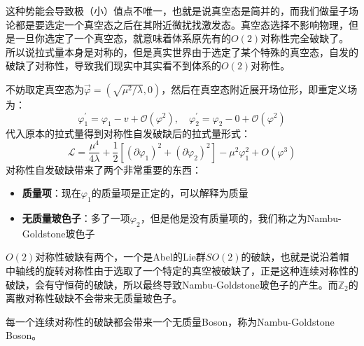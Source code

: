 这种势能会导致极（小）值点不唯一，也就是说真空态是简并的，而我们做量子场论都是要选定一个真空态之后在其附近微扰找激发态。真空态选择不影响物理，但是一旦你选定了一个真空态，就意味着体系原先有的$O(2)$对称性完全破缺了。所以说拉式量本身是对称的，但是真实世界由于选定了某个特殊的真空态，自发的破缺了对称性，导致我们现实中其实看不到体系的$O(2)$对称性。

不妨取定真空态为$\vec{\varphi}=(\sqrt{\mu^2/\lambda},0)$，然后在真空态附近展开场位形，即重定义场为：
\begin{equation}
	\varphi_1^\prime=\varphi_1-v+\mathcal{O}(\varphi^2),\quad \varphi_2^\prime=\varphi_2-0+\mathcal{O}(\varphi^2)
\end{equation}
代入原本的拉式量得到对称性自发破缺后的拉式量形式：
\begin{equation}
	\mathcal{L}=\frac{\mu^4}{4\lambda}+\frac{1}{2}\left[(\partial\varphi_1)^2+(\partial\varphi_2)^2\right]-\mu^2\varphi_1^2+O(\varphi^3)
\end{equation}
对称性自发破缺带来了两个非常重要的东西：
\begin{itemize}
	\item \textbf{质量项}：现在$\varphi_1$的质量项是正定的，可以解释为质量
	\item \textbf{无质量玻色子}：多了一项$\varphi_2$，但是他是没有质量项的，我们称之为Nambu-Goldstone玻色子
\end{itemize}
$O(2)$对称性破缺有两个，一个是Abel的Lie群$SO(2)$的破缺，也就是说沿着帽中轴线的旋转对称性由于选取了一个特定的真空被破缺了，正是这种连续对称性的破缺，会有守恒荷的破缺，所以最终导致Nambu-Goldstone玻色子的产生。而$\mathbb{Z}_2$的离散对称性破缺不会带来无质量玻色子。
\begin{theorem}
	每一个连续对称性的破缺都会带来一个无质量Boson，称为Nambu-Goldstone Boson。
\end{theorem}
